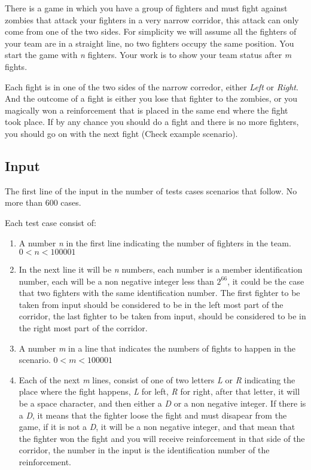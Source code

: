 
There is a game in which you have a group of fighters and must fight against zombies that attack your fighters in a very narrow corridor, this attack can only come from one of the two sides. For simplicity we will assume all the fighters of your team are in a straight line, no two fighters occupy the same position. You start the game with \textit{n} fighters. Your work is to show your team status after \textit{m} fights.

Each fight is in one of the two sides of the narrow corredor, either \textit{Left} or \textit{Right}. And the outcome of a fight is either you lose that fighter to the zombies, or you magically won a reinforcement that is placed in the same end where the fight took place. If by any chance you should do a fight and there is no more fighters, you should go on with the next fight (Check example scenario).


\subsection* {Input}

The first line of the input in the number of tests cases scenarios that follow. No more than 600 cases.

Each test case consist of:

\begin{enumerate}
	\item A number \textit{n} in the first line indicating the number of fighters in the team. $0 < n < 100001$
	\item In the next line it will be \textit{n} numbers, each number is a member identification number, each will be a non negative integer less than $2^{66}$, it could be the case that two fighters with the same identification number. The first fighter to be taken from input should be considered to be in the left most part of the corridor, the last fighter to be taken from input, should be considered to be in the right most part of the corridor.
	\item A number \textit{m} in a line that indicates the numbers of fights to happen in the scenario. $0 < m < 100001$
	\item Each of the next \textit{m} lines, consist of one of two letters \textit{L} or \textit{R} indicating the place where the fight happens, \textit{L} for left, \textit{R} for right, after that letter, it will be a space character, and then either a \textit{D} or a non negative integer. If there is a \textit{D}, it means  that the fighter loose the fight and must disapear from the game, if it is not a \textit{D}, it will be a non negative integer, and that mean that the fighter won the fight and you will receive reinforcement in that side of the corridor, the number in the input is the identification number of the reinforcement. 
\end{enumerate}

